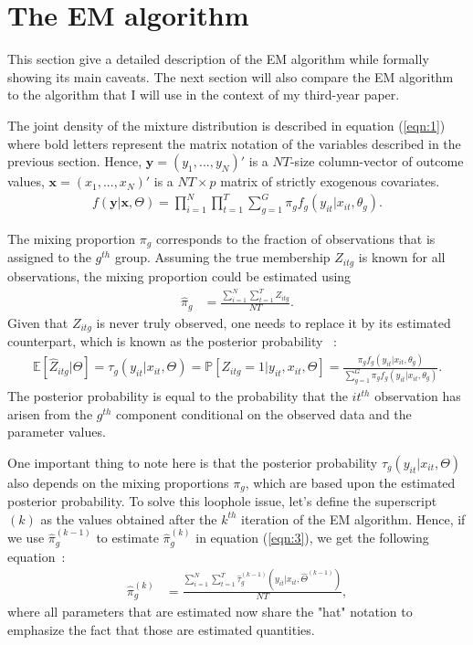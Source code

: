 \documentclass[11pt,letter]{article}
\begin{document}
\section{The EM algorithm}
This section give a detailed description of the EM algorithm while formally showing its main caveats. The next section will also compare the EM algorithm to the algorithm that I will use in the context of my third-year paper.
\par
The joint density of the mixture distribution is described in equation (\ref{eqn:1}) where bold letters represent the matrix notation of the variables described in the previous section. Hence, $\mathbf{y} = (y_1,...,y_N)'$ is a $NT$-size column-vector of outcome values, $\mathbf{x} = (x_1,...,x_N)'$ is a $NT \times p$ matrix of strictly exogenous covariates.
\begin{align}\label{eqn:2}
f(\mathbf{y}|\mathbf{x},\Theta) = \prod_{i=1}^N \prod_{t=1}^T \sum_{g=1}^G \pi_g f_g(y_{it}|x_{it},\theta_g).
\end{align} 
\par
The mixing proportion $\pi_g$ corresponds to the fraction of observations that is assigned to the $g^{th}$ group. Assuming the true membership $Z_{itg}$ is known for all observations, the mixing proportion could be estimated using
\begin{align} \label{eqn:3}
\hat{\pi}_g &= \frac{\sum_{i=1}^N\sum_{t=1}^T Z_{itg}}{NT}.
\end{align}
Given that $Z_{itg}$ is never truly observed, one needs to replace it by its estimated counterpart, which is known as the posterior probability \citep{mclachlan_finite_2019}~:
\begin{align} \label{eqn:4}
\mathbb{E}[\hat{Z}_{itg}|\Theta] = \tau_{g}(y_{it}|x_{it},\Theta) = \mathbb{P}[Z_{itg}=1|y_{it},x_{it},\Theta] = \frac{\pi_g f_g(y_{it}|x_{it},\theta_g)}{\sum_{g=1}^G \pi_g f_g(y_{it}|x_{it},\theta_g)}.
\end{align}
The posterior probability is equal to the probability that the $it^{th}$ observation has arisen from the $g^{th}$ component conditional on the observed data and the parameter values.
\par
One important thing to note here is that the posterior probability $\tau_{g}(y_{it}|x_{it},\Theta)$ also depends on the mixing proportions $\pi_g$, which are based upon the estimated posterior probability. To solve this loophole issue, let's define the superscript ${(k)}$ as the values obtained after the $k^{th}$ iteration of the EM algorithm. Hence, if we use $\hat{\pi}_g^{(k-1)}$ to estimate $\hat{\pi}_g^{(k)}$ in equation (\ref{eqn:3}), we get the following equation~:
\begin{align} \label{eqn:5}
\hat{\pi}^{(k)}_g &= \frac{\sum_{i=1}^N\sum_{t=1}^T  \hat{\tau}^{(k-1)}_{g}(y_{it}|x_{it},\hat{\Theta}^{(k-1)}) }{NT},
\end{align}
where all parameters that are estimated now share the "hat" notation to emphasize the fact that those are estimated quantities.
\par
\end{document}

